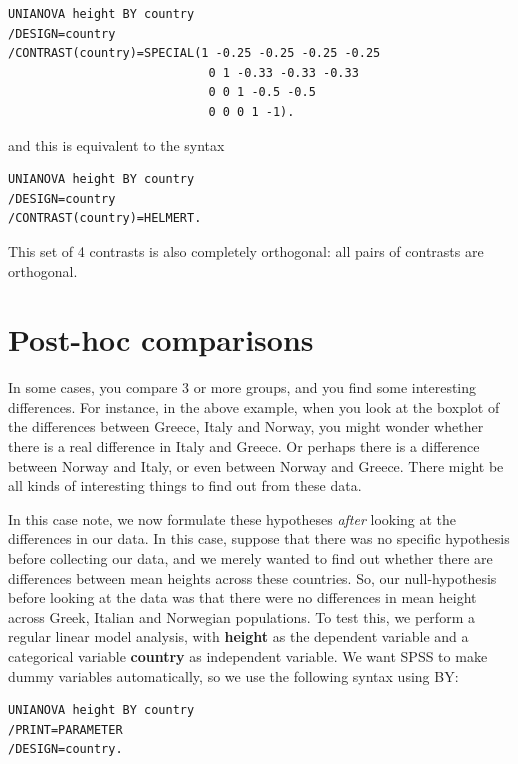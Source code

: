 \documentclass[]{book}\usepackage[]{graphicx}\usepackage[]{color}
\begin{document}
\begin{verbatim}
UNIANOVA height BY country
/DESIGN=country
/CONTRAST(country)=SPECIAL(1 -0.25 -0.25 -0.25 -0.25
                            0 1 -0.33 -0.33 -0.33
                            0 0 1 -0.5 -0.5
                            0 0 0 1 -1).
\end{verbatim}

and this is equivalent to the syntax 

\begin{verbatim}
UNIANOVA height BY country
/DESIGN=country
/CONTRAST(country)=HELMERT.
\end{verbatim}


This set of 4 contrasts is also completely orthogonal: all pairs of contrasts are orthogonal.





\section{Post-hoc comparisons}

In some cases, you compare 3 or more groups, and you find some interesting differences. For instance, in the above example, when you look at the boxplot of the  differences between Greece, Italy and Norway, you might wonder whether there is a real difference in Italy and Greece. Or perhaps there is a difference between Norway and Italy, or even between Norway and Greece. There might be all kinds of interesting things to find out from these data.

In this case note, we now formulate these hypotheses \textit{after} looking at the differences in our data. In this case, suppose that there was no specific hypothesis before collecting our data, and we merely wanted to find out whether there are differences between mean heights across these countries. So, our null-hypothesis before looking at the data was that there were no differences in mean height across Greek, Italian and Norwegian populations. To test this, we perform a regular linear model analysis, with \textbf{height} as the dependent variable and a categorical variable \textbf{country} as independent variable. We want SPSS to make dummy variables automatically, so we use the following syntax using BY:

\begin{verbatim}
UNIANOVA height BY country
/PRINT=PARAMETER
/DESIGN=country.
\end{verbatim}
\end{document}
